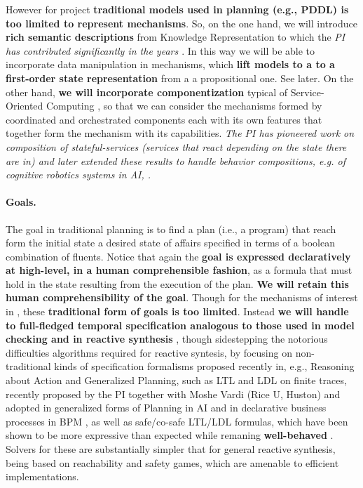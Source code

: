 However for project \textbf{traditional models used in planning (e.g., PDDL) is too limited to represent mechanisms}. 
So, on the one hand, we will introduce \textbf{rich semantic descriptions} from
Knowledge Representation 
to which the \emph{PI has contributed significantly in the years
\cite{DeGiacomoRS98,DeGiacomoLL00,DeGiacomoLS01,SardinaGLL04,SardinaGLL06,DeGiacomoLP10,DeGiacomoLM12,DeGiacomoLPV14,DeGiacomoLPV16,BanihashemiGL17}}.
In this way we will be able to incorporate data manipulation in
mechanisms, which \textbf{lift models to a to a first-order state
  representation} from a a propositional one. See later.
On the other hand, \textbf{we will incorporate componentization} typical of Service-Oriented Computing \cite{wsf2014,SohrabiPM09,BertoliPT10,DePS13,DeGGPSS16}, so that we can consider the mechanisms formed by coordinated and orchestrated components each with its own features that together form the mechanism with its capabilities. 
\emph{The PI has pioneered work on composition of  stateful-services (services that react depending on the state there are in) \cite{BerardiCGLM03,BerardiCGHM05} and later extended  these results to handle behavior compositions, e.g. of cognitive robotics systems in AI, \cite{SardinaG08,SardinaG09,DePS13,DeGGPSS16}.}




\paragraph{Goals.}
The goal in traditional planning is to find a plan (i.e., a program)
that reach form the initial state a desired state of affairs specified
in terms of a boolean combination of fluents. Notice that again the
\textbf{goal is expressed declaratively at high-level, in a human comprehensible fashion}, as a formula that must
hold in the state resulting from the execution of the plan. \textbf{We will retain this human comprehensibility of the goal}. 
Though for the mechanisms of interest in \project, these
\textbf{traditional form of goals is too limited}. Instead \textbf{we will
handle to full-fledged temporal specification analogous to those used in model
checking and in reactive synthesis} \cite{ClarkeGP:99-ModelChecking,BaKG08,PnRo89}, though sidestepping the notorious difficulties algorithms required for reactive syntesis, by
focusing on non-traditional kinds of specification formalisms proposed
recently in, e.g., Reasoning about Action and Generalized Planning,
such as LTL and LDL on finite traces, recently proposed by the PI
together with Moshe Vardi (Rice U, Huston) \cite{DeVa13,DeVa15,DeVa16}
and adopted in generalized forms of Planning in AI
\cite{TorresB15,CamachoTMBM17} and in declarative business processes
in BPM \cite{AalstPS09,DeGMGMM14,DeGMMP17}, as well as safe/co-safe
LTL/LDL formulas, which have been shown to be more expressive than
expected while remaning \textbf{well-behaved}
\cite{FinkbeinerS13,FiliotJR11,Lacerda0H15,FaymonvilleFRT17}. Solvers
for these are substantially simpler that for general reactive
synthesis, being based on reachability and safety games, which are
amenable to efficient implementations.


